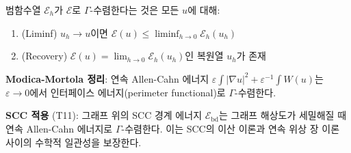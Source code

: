 \begin{definition}[$\Gamma$-수렴]
범함수열 $\mathcal{E}_h$가 $\mathcal{E}$로 $\Gamma$-수렴한다는 것은 모든 $u$에 대해:
\begin{enumerate}
    \item (Liminf) $u_h \to u$이면 $\mathcal{E}(u) \leq \liminf_{h \to 0} \mathcal{E}_h(u_h)$
    \item (Recovery) $\mathcal{E}(u) = \lim_{h \to 0} \mathcal{E}_h(u_h)$인 복원열 $u_h$가 존재
\end{enumerate}
\end{definition}

\textbf{Modica-Mortola 정리}: 연속 Allen-Cahn 에너지 $\varepsilon \int |\nabla u|^2 + \varepsilon^{-1} \int W(u)$는 $\varepsilon \to 0$에서 인터페이스 에너지(perimeter functional)로 $\Gamma$-수렴한다.

\textbf{SCC 적용} (T11): 그래프 위의 SCC 경계 에너지 $\mathcal{E}_{\mathrm{bd}}$는 그래프 해상도가 세밀해질 때 연속 Allen-Cahn 에너지로 $\Gamma$-수렴한다. 이는 SCC의 이산 이론과 연속 위상 장 이론 사이의 수학적 일관성을 보장한다.
